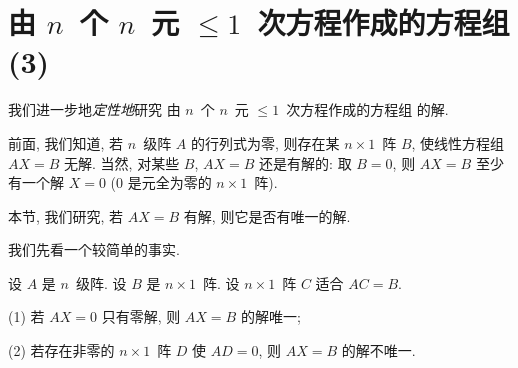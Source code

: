 \section{\texorpdfstring{由 \(n\)~个 \(n\)~元
      \({\leq} 1\)~次方程作成的方程组 (3)}%
  {由 n 个 n 元 ≤1 次方程作成的方程组 (3)}}

\maldevigalegajxo

我们进一步地\emph{定性地}研究%
由 \(n\)~个 \(n\)~元 \({\leq} 1\)~次方程作成的方程组%
的解.

前面, 我们知道,
若 \(n\)~级阵 \(A\) 的行列式为零,
则存在某 \(n \times 1\)~阵 \(B\),
使线性方程组 \(AX = B\) 无解.
当然, 对某些 \(B\),
\(AX = B\) 还是有解的:
取 \(B = 0\),
则 \(AX = B\) 至少有一个解 \(X = 0\)
(\(0\) 是元全为零的 \(n \times 1\)~阵).

本节, 我们研究, 若 \(AX = B\) 有解,
则它是否有唯一的解.

我们先看一个较简单的事实.

\begin{theorem}
    设 \(A\) 是 \(n\)~级阵.
    设 \(B\) 是 \(n \times 1\)~阵.
    设 \(n \times 1\)~阵 \(C\) 适合 \(AC = B\).

    (1)
    若 \(AX = 0\) 只有零解, 则 \(AX = B\) 的解唯一;

    (2)
    若存在非零的 \(n \times 1\)~阵 \(D\)
    使 \(AD = 0\),
    则 \(AX = B\) 的解不唯一.
\end{theorem}

